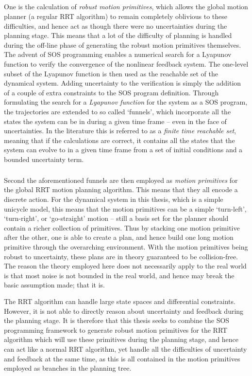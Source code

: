 \subparagraph{} One is the calculation of \textit{robust motion primitives},
which allows the global motion planner (a regular \ac{RRT} algorithm) to remain
completely oblivious to these difficulties, and hence act as though there were
no uncertainties during the planning stage. This means that a lot of the
difficulty of planning is handled during the off-line phase of generating the
robust motion primitives themselves. The advent of \ac{SOS} programming enables
a numerical search for a Lyapunov function to verify the convergence of the
nonlinear feedback system. The one-level subset of the Lyapunov function is then
used as the reachable set of the dynamical system. Adding uncertainty to the
verification is simply the addition of a couple of extra constraints to the
\ac{SOS} program definition. Through formulating the search for a
\textit{Lyapunov function} for the system as a \ac{SOS} program, the
trajectories are extended to so called `funnels', which incorporate all the
states the system can be in during a given time frame -- even in the face of
uncertainties. In the literature this is referred to as a \textit{finite time
  reachable set}, meaning that if the calculations are correct, it contains all
the states that the system can evolve to in a given time frame from a set of
initial conditions and a bounded uncertainty term.


\subparagraph{} Second the aforementioned funnels are then employed as
\textit{motion primitives} for the global \ac{RRT} motion planning algorithm.
This means that they all encode a discrete action. For the dynamical system in
this thesis, which is a simple unicycle model, this means that the motion
primitives can be a simple `turn-left', `turn-right', or `go-straight' motion --
still a basis set for the planner should contain a richer collection of
primitives. Thus by stacking one motion primitive after the other, one is able
to create a plan, and hence build one long motion primitive through the
overarching environment. With the motion primitives being robust to uncertainty,
these plans are in theory guaranteed to be collision-free. The reason the theory
employed here does not necessarily apply to the real world is that most noise is
not bounded in the real world, and hence may break the basic assumption made;
that it is.

The \ac{RRT} algorithm can handle large state spaces and differential
constraints. However, it is not able to directly reason about uncertainty and
feedback during the planning stage. It is therefore that this thesis seeks to
combine the \ac{SOS} programming framework to generate robust motion primitives
for the \ac{RRT} algorithm which will use these primitives during the planning
stage, and hence can act like a normal \ac{RRT} algorithm, yet handle all the
difficulties of uncertainty and feedback at the same time, as this is all
contained in the motion primitives employed as branches in the planning tree.

